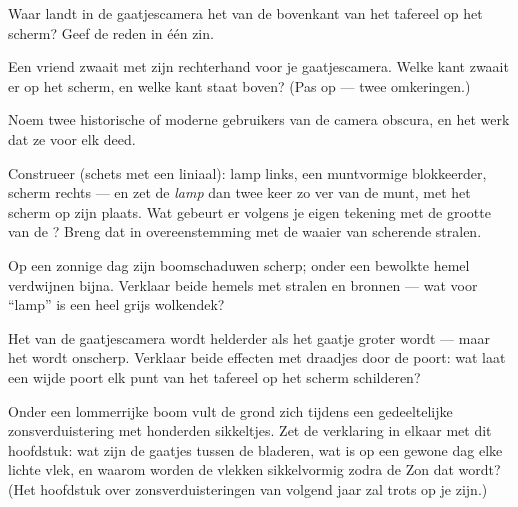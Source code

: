 \begin{exercise}[$\star$]\label{exo:g6:light-propagation:6}
Waar landt in de gaatjescamera het  van de bovenkant van het
tafereel op het scherm? Geef de reden in één zin.
\end{exercise}

\begin{exercise}[$\star$]\label{exo:g6:light-propagation:7}
Een vriend zwaait met zijn rechterhand voor je gaatjescamera. Welke
kant zwaait er op het scherm, en welke kant staat boven? (Pas op ---
twee omkeringen.)
\end{exercise}

\begin{exercise}[$\star$]\label{exo:g6:light-propagation:8}
Noem twee historische of moderne gebruikers van de camera obscura, en
het werk dat ze voor elk deed.
\end{exercise}

\begin{exercise}[$\star\star$]\label{exo:g6:light-propagation:9}
Construeer (schets met een liniaal): lamp links, een muntvormige
blokkeerder, scherm rechts --- en zet de \emph{lamp} dan twee keer zo
ver van de munt, met het scherm op zijn plaats. Wat gebeurt er volgens
je eigen tekening met de grootte van de ? Breng dat in
overeenstemming met de waaier van scherende stralen.
\end{exercise}

\begin{exercise}[$\star\star$]\label{exo:g6:light-propagation:10}
Op een zonnige dag zijn boomschaduwen scherp; onder een bewolkte hemel
verdwijnen  bijna. Verklaar beide hemels met stralen en
bronnen --- wat voor ``lamp'' is een heel grijs wolkendek?
\end{exercise}

\begin{exercise}[$\star\star$]\label{exo:g6:light-propagation:11}
Het  van de gaatjescamera wordt helderder als het gaatje groter
wordt --- maar het wordt onscherp. Verklaar beide effecten met
draadjes door de poort: wat laat een wijde poort elk punt van het
tafereel op het scherm schilderen?
\end{exercise}

\begin{exercise}[$\star\star\star$]\label{exo:g6:light-propagation:12}
Onder een lommerrijke boom vult de grond zich tijdens een gedeeltelijke
zonsverduistering met honderden sikkeltjes. Zet de verklaring in
elkaar met dit hoofdstuk: wat zijn de gaatjes tussen de bladeren, wat
is op een gewone dag elke lichte vlek, en waarom worden de vlekken
sikkelvormig zodra de Zon dat wordt? (Het hoofdstuk over
zonsverduisteringen van volgend jaar zal trots op je zijn.)
\end{exercise}

